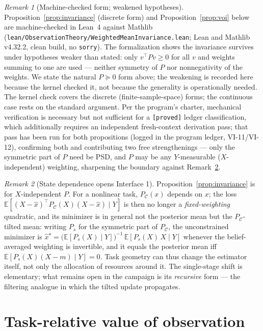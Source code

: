 \documentclass[letterpaper,onecolumn]{IEEEtran}
\theoremstyle{definition}
\theoremstyle{remark}
\newtheorem{remark}{Remark}
\newcommand{\E}{\mathbb{E}}
\newcommand{\PC}{P_{\mathcal{C}}}
\begin{document}
\begin{remark}[Machine-checked form; weakened hypotheses]
\label{rem:kernel}
Proposition~\ref{prop:invariance} (discrete form) and
Proposition~\ref{prop:voi} below are machine-checked in Lean~4 against
Mathlib (\texttt{lean/ObservationTheory/WeightedMeanInvariance.lean}; Lean
and Mathlib v4.32.2, clean build, no \texttt{sorry}). The formalization shows
the invariance survives under hypotheses weaker than stated: only
$v^{\top}Pv\ge 0$ for all $v$ and weights summing to one are used --- neither
symmetry of $P$ nor nonnegativity of the weights. We state the natural
$P\succeq 0$ form above; the weakening is recorded here because the kernel
checked it, not because the generality is operationally needed. The kernel
check covers the discrete (finite-sample-space) forms; the continuous case
rests on the standard argument. Per the program's charter, mechanical
verification is necessary but not sufficient for a \texttt{[proved]} ledger
classification, which additionally requires an independent fresh-context
derivation pass; that pass has been run for both propositions (logged in
the program ledger, VI-11/VI-12), confirming both and contributing two free
strengthenings --- only the symmetric part of $P$ need be PSD, and $P$ may
be any $Y$-measurable ($X$-independent) weighting, sharpening the boundary
against Remark~\ref{rem:statedep}.
\end{remark}

\begin{remark}[State dependence opens Interface 1]
\label{rem:statedep}
Proposition~\ref{prop:invariance} is for $X$-independent $P$. For a
nonlinear task, $\PC(x)$ depends on $x$; the loss
$\E[(X-\hat x)^{\top}\PC(X)(X-\hat x)\mid Y]$ is then no longer a
\emph{fixed-weighting} quadratic, and its minimizer is in general not the
posterior mean but the $\PC$-tilted mean: writing $P_s$ for the symmetric
part of $\PC$, the unconstrained minimizer is
$\hat x^{\star}=\big(\E[P_s(X)\mid Y]\big)^{-1}\,\E[P_s(X)\,X\mid Y]$
whenever the belief-averaged weighting is invertible, and it equals the
posterior mean iff $\E[P_s(X)(X-m)\mid Y]=0$. Task geometry can thus
change the estimator itself, not only the allocation of resources around
it. The single-stage shift is elementary; what remains open in the
campaign is its \emph{recursive} form --- the filtering analogue in which
the tilted update propagates.
\end{remark}

\section{Task-relative value of observation}
\label{sec:voi}
\end{document}
